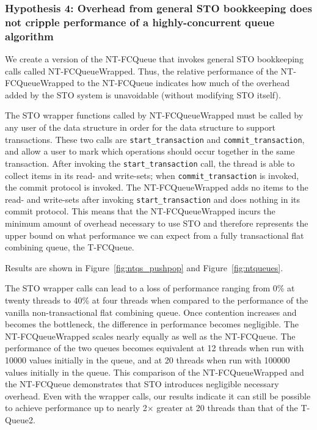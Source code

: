 
\subsubsection{Hypothesis 4: Overhead from general STO bookkeeping does not cripple performance of a highly-concurrent queue algorithm}

We create a version of the NT-FCQueue that invokes general STO bookkeeping calls called NT-FCQueueWrapped. Thus, the relative performance of the NT-FCQueueWrapped to the NT-FCQueue indicates how much of the overhead added by the STO system is unavoidable (without modifying STO itself). 

The STO wrapper functions called by NT-FCQueueWrapped must be called by any user of the data structure in order for the data structure to support transactions.
These two calls are \texttt{start\_transaction} and \texttt{commit\_transaction}, and allow a user to mark which operations should occur together in the same transaction. After invoking the \texttt{start\_transaction} call, the thread is able to collect items in its read- and write-sets; when \texttt{commit\_transaction} is invoked, the commit protocol is invoked. The NT-FCQueueWrapped adds no items to the read- and write-sets after invoking \texttt{start\_transaction} and does nothing in its commit protocol. This means that the NT-FCQueueWrapped incurs the minimum amount of overhead necessary to use STO and therefore represents the upper bound on what performance we can expect from a fully transactional flat combining queue, the T-FCQueue. 

Results are shown in Figure~\ref{fig:ntqs_pushpop} and Figure~\ref{fig:ntqueues}. 

The STO wrapper calls can lead to a loss of performance ranging from 0\% at twenty threads to 40\% at four threads when compared to the performance of the vanilla non-transactional flat combining queue. Once contention increases and becomes the bottleneck, the difference in performance becomes negligible. The NT-FCQueueWrapped scales nearly equally as well as the NT-FCQueue. The performance of the two queues becomes equivalent at 12 threads when run with 10000 values initially in the queue, and at 20 threads when run with 100000 values initially in the queue. This comparison of the NT-FCQueueWrapped and the NT-FCQueue demonstrates that STO introduces negligible necessary overhead. Even with the wrapper calls, our results indicate it can still be possible to achieve performance up to nearly 2$\times$ greater at 20 threads than that of the T-Queue2.

